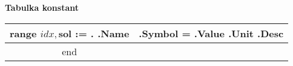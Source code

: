 \documentclass[a4paper,11pt]{article}
\begin{document}
\center\sf\large{\textbf{ Tabulka konstant }}
\begin{longtable}{|c|c|}
\\ \hline
{{range $idx, $sol := .}}
  \textbf{ {{.Name}} } & {{.Symbol}} = {{.Value}} {{.Unit}} {{.Desc}}
  \\ \hline
{{end}}
\end{longtable}
\end{document}
